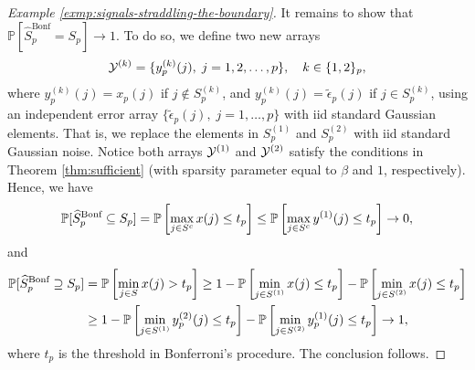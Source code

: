 \begin{example}
\begin{proof}[Example \ref{exmp:signals-straddling-the-boundary}]
It remains to show that $\mathbb{P}[\widehat{S}^{\text{Bonf}}_p=S_p]\to 1$.
To do so, we define two new arrays 
$$
{\cal Y}^{(k)} = \{y^{(k)}_p(j),\;j=1,2,\ldots,p\},\quad k\in\{1,2\}_p,
$$
where $y^{(k)}_p(j)=x_p(j)$ if $j\not\in S^{(k)}_p$, and $y^{(k)}_p(j)=\widetilde{\epsilon}_p(j)$ if $j\in S^{(k)}_p$, using an independent error array $\{\widetilde{\epsilon}_p(j),\;j=1,\ldots,p\}$ with iid standard Gaussian elements.
That is, we replace the elements in $S^{(1)}_p$ and $S^{(2)}_p$ with iid standard Gaussian noise.
Notice both arrays ${\cal Y}^{(1)}$ and ${\cal Y}^{(2)}$ satisfy the conditions in Theorem \ref{thm:sufficient} (with sparsity parameter equal to $\beta$ and $1$, respectively). 
Hence, we have
$$
\P[\widehat{S}^{\text{Bonf}}_p\subseteq S_p] 
= \P\left[\max_{j\in S^c}x(j) \le t_p\right]
\le \P\left[\max_{j\in S^c}y^{(1)}(j) \le t_p\right] \to 0,
$$
and 
\begin{align*}
    \P[\widehat{S}^{\text{Bonf}}_p\supseteq S_p]
    &= \P\left[\min_{j\in S}x(j) > t_p\right] 
    \ge 1 - \P\left[\min_{j\in S^{(1)}}x(j) \le t_p\right] - \P\left[\min_{j\in S^{(2)}}x(j) \le t_p\right] \\
    &\ge 1 - \P\left[\min_{j\in S^{(1)}}y^{(2)}_p(j) \le t_p\right] - \P\left[\min_{j\in S^{(2)}}y^{(1)}_p(j) \le t_p\right] 
    \to 1,
\end{align*}
where $t_p$ is the threshold in Bonferroni's procedure. The conclusion follows.


\end{proof}
\end{example}
